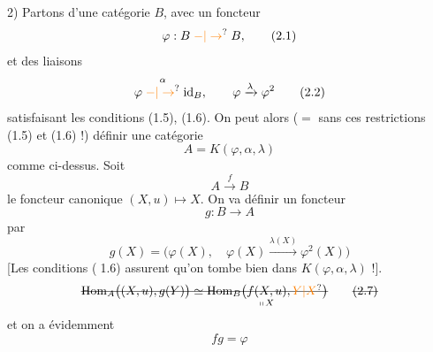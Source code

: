 2) Partons d'une catégorie $B$, avec un foncteur
\[
 \varphi:B\mathrel{\unsure{-|\to}}B, \tag*{(2.1)}
\]
 et des liaisons 
\[
 \varphi\mathrel{\overset{\alpha}{\unsure{-|\to}}}\mathrm{id}_B,\qquad\varphi\xrightarrow{\lambda}\varphi^2 \tag*{(2.2)}
\]
satisfaisant les conditions (1.5), (1.6). On peut alors (\(=\) sans ces restrictions (1.5) et (1.6) !) définir une catégorie
\[
 A=K(\varphi,\alpha,\lambda) \tag*{(2.3)}
\]
comme ci-dessus. Soit
\[
 A\xrightarrow{f}B \tag*{(2.4)}
\]
le foncteur  canonique $(X,u)\longmapsto X$. On  va définir un foncteur
\[
 g:B\longrightarrow A \tag*{(2.5)}
\]
par
\[
 g(X)=\bigl(\varphi(X),\quad\varphi(X)\xrightarrow{\lambda(X)}\varphi^{2}(X)\bigr) \tag*{(2.6)}
\]
[Les conditions  \textcircled{\scriptsize (1.6)} assurent qu'on tombe bien dans $K(\varphi,\alpha,\lambda)$ !].
\[
 \deleted{\mathrm{Hom}_A\bigl((X,u),g(Y)\bigr)\simeq\mathrm{Hom}_B\bigl(\underset{\shortparallel\,X}{f(X,u)},\unsure{Y|X}\bigr)} \tag*{\deleted{(2.7)}}
\]
et on a évidemment
\[
 fg=\varphi \tag*{(2.7)}
\]

